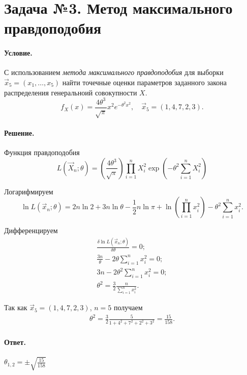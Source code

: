 
\section{Задача №3. Метод максимального правдоподобия}

\paragraph{Условие.} С использованием \emph{метода максимального правдоподобия} для выборки $\vec{x}_5 = (x_1, \dots, x_5)$ найти точечные оценки параметров заданного закона распределения генеральноий совокупности $X$.
\[
    f_X(x) = \frac{4\theta^3}{\sqrt{\pi}} x^2 e^{-\theta^2 x^2}, \quad \vec{x}_5 = (1, 4, 7, 2, 3).
\]

\paragraph{Решение.}

\noindent
Функция правдоподобия
\[
    L(\vec{X}_n; \theta) = \left( \frac{4 \theta^3}{\sqrt{\pi}} \right) \prod_{i = 1}^{n} X_i^2 \exp \left( - \theta^2 \sum_{i = 1}^n X_i^2 \right)
\]

\noindent
Логарифмируем
\[
    \ln L(\vec{x}_n; \theta) = 2n \ln 2 + 3n \ln \theta - \frac{1}{2} n \ln\pi + \ln\left( \prod_{i = 1}^{n} x_i^2 \right) - \theta^2 \sum_{i = 1}^n x_i^2.
\]

\noindent
Дифференцируем
\begin{align}
    \frac{\delta\ln L(\vec{x}_n; \theta)}{\delta\theta} = 0;
    \\
    \frac{3n}{\theta} - 2 \theta \sum_{i = 1}^n x_i^2 = 0;
    \\
    3n - 2\theta^2\sum_{i = 1}^n x_i^2 = 0;
    \\
    \theta^2 = \frac{3}{2}\frac{n}{\sum_{i = 1}^n x_i^2}.
\end{align}

\noindent
Так как $\vec{x}_5 = (1, 4, 7, 2, 3)$, $n = 5$ получаем
\begin{align}
    \theta^2 = \frac{3}{2} \frac{5}{1 + 4^2 + 7^2 + 2^2 + 3^2} = \frac{15}{158}.
\end{align}

\paragraph{Ответ.} $\displaystyle\theta_{1, 2} = \pm \sqrt{\frac{15}{158}}$